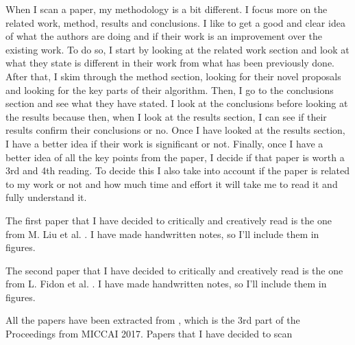 \documentclass{article}
\begin{document}
When I scan a paper, my methodology is a bit different. I focus more on the related work, method, results and conclusions. I like to get a good and clear idea of what the authors are doing and if their work is an improvement over the existing work. To do so, I start by looking at the related work section and look at what they state is different in their work from what has been previously done. After that, I skim through the method section, looking for their novel proposals and looking for the key parts of their algorithm. Then, I go to the conclusions section and see what they have stated. I look at the conclusions before looking at the results because then, when I look at the results section, I can see if their results confirm their conclusions or no. Once I have looked at the results section, I have a better idea if their work is significant or not. Finally, once I have a better idea of all the key points from the paper, I decide if that paper is worth a 3rd and 4th reading. To decide this I also take into account if the paper is related to my work or not and how much time and effort it will take me to read it and fully understand it.


The first paper that I have decided to critically and creatively read is the one from M. Liu et al. \cite{10.1007/978-3-319-66179-7_1}. I have made handwritten notes, so I'll include them in figures.

The second paper that I have decided to critically and creatively read is the one from L. Fidon et al. \cite{10.1007/978-3-319-66179-7_33}. I have made handwritten notes, so I'll include them in figures.

All the papers have been extracted from \cite{MICCAI}, which is the 3rd part of the Proceedings from MICCAI 2017. 
Papers that I have decided to scan \cite{10.1007/978-3-319-66179-7_1,10.1007/978-3-319-66179-7_5,10.1007/978-3-319-66179-7_10,10.1007/978-3-319-66179-7_26,10.1007/978-3-319-66179-7_27,10.1007/978-3-319-66179-7_33,10.1007/978-3-319-66179-7_36,10.1007/978-3-319-66179-7_38}
\end{document}
